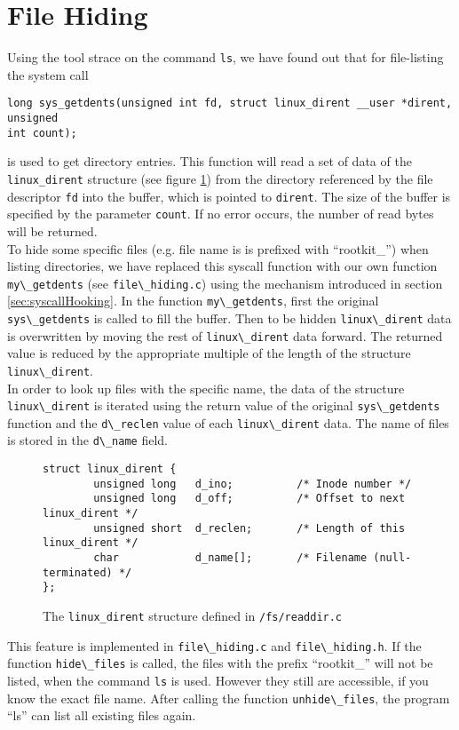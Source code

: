 \section{File Hiding}
Using the tool strace on the command \texttt{ls}, we have found out that for file-listing the system call 
\begin{center}
\lstset{escapechar=,style=customc}
\begin{lstlisting}
long sys_getdents(unsigned int fd, struct linux_dirent __user *dirent, unsigned 
int count);
\end{lstlisting}
\end{center}
is used to get directory entries. This function will read a set of data of the \verb+linux_dirent+ structure (see figure \ref{ls:dirent}) from the directory referenced by the file descriptor \texttt{fd} into the buffer, which is pointed to \texttt{dirent}. The size of the buffer is specified by the parameter \texttt{count}. If no error occurs, the number of read bytes will be returned.\\
To hide some specific files (e.g. file name is is prefixed with ``rootkit\_'') when listing directories, we have replaced this syscall function with our own function \verb+my\_getdents+ (see \verb+file\_hiding.c+) using the mechanism introduced in section \ref{sec:syscallHooking}. In the function \verb+my\_getdents+, first the original \verb+sys\_getdents+ is called to fill the buffer. Then to be hidden \verb+linux\_dirent+ data is overwritten by moving the rest of \verb+linux\_dirent+ data forward. The returned value is reduced by the appropriate multiple of the length of the structure \verb+linux\_dirent+.\\ 
In order to look up files with the specific name, the data of the structure \verb+linux\_dirent+ is iterated using the return value of the original \verb+sys\_getdents+ function and the \verb+d\_reclen+ value of each \verb+linux\_dirent+ data. The name of files is stored in the \verb+d\_name+ field. 
\begin{center}
\begin{figure}[h]
\lstset{escapechar=,style=customc}
\begin{lstlisting}
struct linux_dirent {
        unsigned long   d_ino;		 	/* Inode number */
        unsigned long   d_off;  		/* Offset to next linux_dirent */
        unsigned short  d_reclen;		/* Length of this linux_dirent */
        char            d_name[];		/* Filename (null-terminated) */
};
\end{lstlisting}
\caption{The \texttt{linux\_dirent} structure defined in \texttt{/fs/readdir.c}}
\label{ls:dirent}
\end{figure}
\end{center}
This feature is implemented in \verb+file\_hiding.c+ and \verb+file\_hiding.h+. If the function \verb+hide\_files+ is called, the files with the prefix ``rootkit\_'' will not be listed, when the command \texttt{ls} is used. However they still are accessible, if you know the exact file name. After calling the function \verb+unhide\_files+, the program ``ls'' can list all existing files again. 

